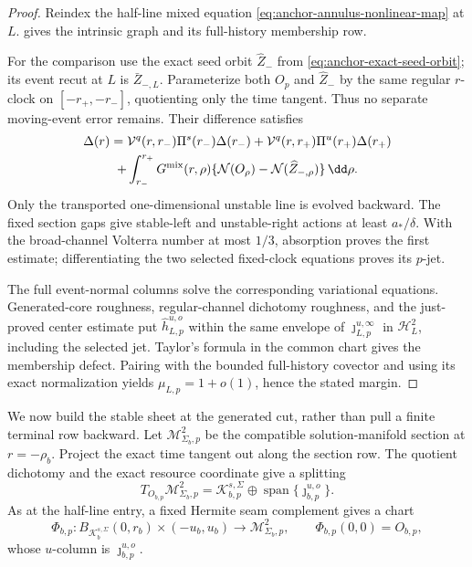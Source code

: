 \begin{proof}
Reindex the half-line mixed equation
\cref{eq:anchor-annulus-nonlinear-map} at \(L\).
gives the intrinsic graph and its full-history membership row.

For the comparison use the exact seed orbit \(\widehat Z_-\) from
\cref{eq:anchor-exact-seed-orbit}; its event recut at \(L\) is
\(\bar Z_{-,L}\).  Parameterize both \(O_p\) and \(\widehat Z_-\) by the
same regular \(r\)-clock on \([-r_+,-r_-]\), quotienting only the time
tangent.  Thus no separate moving-event error remains.  Their difference
satisfies
\begin{multline}
 \Delta(r)
 =\mathcal V^q(r,r_-)\Pi^s(r_-)\Delta(r_-)
  +\mathcal V^q(r,r_+)\Pi^u(r_+)\Delta(r_+)\\
  +\int_{r_-}^{r_+}G^{\rm mix}(r,\rho)
       \{\mathcal N(O_\rho)-\mathcal N(\widehat Z_{-,\rho})\}\,\dd\rho .
                                                               \label{eq:anchor-independent-two-sided-identity}
\end{multline}
Only the transported one-dimensional unstable line is evolved backward.
The fixed section gaps give stable-left and unstable-right actions at least
\(a_*/\delta\).  With the broad-channel Volterra number at most \(1/3\),
absorption proves the first estimate; differentiating the two selected
fixed-clock equations proves its \(p\)-jet.

The full event-normal columns solve the corresponding variational equations.
Generated-core roughness, regular-channel dichotomy roughness, and the
just-proved center estimate put
\(\widehat h_{L,p}^{u,o}\) within the same envelope of
\(\jmath_{L,p}^{u,\infty}\) in \(\mathscr H_L^2\), including the selected
jet.  Taylor's formula in the common chart gives the membership defect.
Pairing with the bounded full-history covector and using its exact
normalization yields \(\mu_{L,p}=1+o(1)\), hence the stated margin.
\end{proof}

We now build the stable sheet at the generated cut, rather than pull a
finite terminal row backward.  Let
\(\mathcal M^2_{\Sigma_b,p}\) be the compatible solution-manifold section
at \(r=-\rho_b\).  Project the exact time tangent out along the section
row.  The quotient dichotomy and the exact resource coordinate give a
splitting
\begin{equation}
 T_{O_{b,p}}\mathcal M^2_{\Sigma_b,p}
 =\mathcal K_{b,p}^{s,\Sigma}
   \oplus\operatorname{span}\{\jmath_{b,p}^{u,o}\}.            \label{eq:anchor-b-compatible-splitting}
\end{equation}
As at the half-line entry, a fixed Hermite seam complement gives a chart
\begin{equation}
 \Phi_{b,p}:B_{\mathcal K_b^{s,\Sigma}}(0,r_b)
       \times(-u_b,u_b)\longrightarrow
       \mathcal M^2_{\Sigma_b,p},
 \qquad \Phi_{b,p}(0,0)=O_{b,p},                  \label{eq:anchor-b-compatible-chart}
\end{equation}
whose \(u\)-column is \(\jmath_{b,p}^{u,o}\).

